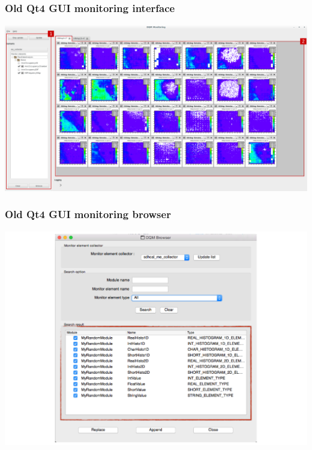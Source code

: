 \documentclass[presentation, 10pt]{beamer}
\begin{document}
\begin{frame}
  \frametitle{Old Qt4 GUI monitoring interface}
  \includegraphics[width=\linewidth]{figs/MonitoringMainWindowGui.pdf}
\end{frame}

\begin{frame}
  \frametitle{Old Qt4 GUI monitoring browser}
  \includegraphics[width=\linewidth]{figs/Browser_SearchResultsAll.pdf}
\end{frame}
\end{document}
